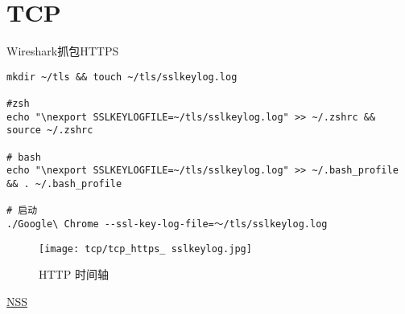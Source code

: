 \chapter{TCP}
\label{chap:tcp}




Wireshark抓包HTTPS

\begin{lstlisting}[style=cshell]
mkdir ~/tls && touch ~/tls/sslkeylog.log

#zsh
echo "\nexport SSLKEYLOGFILE=~/tls/sslkeylog.log" >> ~/.zshrc && source ~/.zshrc

# bash
echo "\nexport SSLKEYLOGFILE=~/tls/sslkeylog.log" >> ~/.bash_profile && . ~/.bash_profile

# 启动
./Google\ Chrome --ssl-key-log-file=～/tls/sslkeylog.log
\end{lstlisting}


\begin{figure}[H]
        \centering
        \texttt{[image: tcp/tcp\_https\_ sslkeylog.jpg]}
        \caption{HTTP 时间轴}
    \end{figure}


    
\href{https://developer.mozilla.org/en-US/docs/Mozilla/Projects/NSS/Key_Log_Format}{NSS}